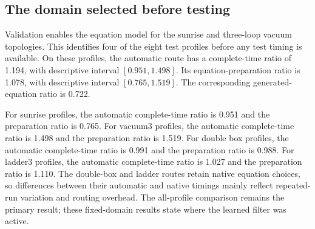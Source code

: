 \subsection{The domain selected before testing}
Validation enables the equation model for the sunrise and three-loop vacuum topologies. This identifies four of the eight test profiles before any test timing is available. On these profiles, the automatic route has a complete-time ratio of 1.194, with descriptive interval $[0.951,1.498]$. Its equation-preparation ratio is 1.078, with descriptive interval $[0.765,1.519]$. The corresponding generated-equation ratio is 0.722.

For sunrise profiles, the automatic complete-time ratio is 0.951 and the preparation ratio is 0.765. For vacuum3 profiles, the automatic complete-time ratio is 1.498 and the preparation ratio is 1.519. For double box profiles, the automatic complete-time ratio is 0.991 and the preparation ratio is 0.988. For ladder3 profiles, the automatic complete-time ratio is 1.027 and the preparation ratio is 1.110. The double-box and ladder routes retain native equation choices, so differences between their automatic and native timings mainly reflect repeated-run variation and routing overhead. The all-profile comparison remains the primary result; these fixed-domain results state where the learned filter was active.

